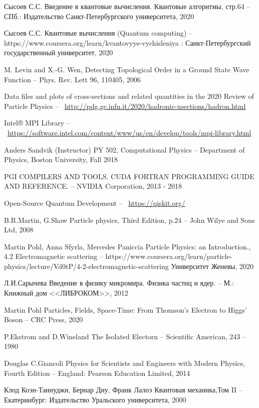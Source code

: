 \documentclass[11pt]{article}
\begin{document}
\begin{thebibliography}{3}
Сысоев С.С. Введение в квантовые вычисления. Квантовые алгоритмы, стр.64 -- СПб.: Издательство Санкт-Петербургского университета, 2020

Сысоев С.С. Квантовые вычисления (Quantum computing) -- https://www.coursera.org/learn/kvantovyye-vychisleniya : Санкт-Петербургский государственный университет, 2020

M. Levin and X.-G. Wen, Detecting Topological Order in a Ground State Wave Function -- Phys. Rev. Lett 96, 110405, 2006

Data files and plots of cross-sections and related quantities
in the 2020 Review of Particle Physics -- ~\url{http://pdg.ge.infn.it/2020/hadronic-xsections/hadron.html}

Intel® MPI Library -- ~\url{https://software.intel.com/content/www/us/en/develop/tools/mpi-library.html}

Anders Sandvik (Instructor) PY 502, Computational Physics -- Department of Physics, Boston University, Fall 2018

PGI COMPILERS AND TOOLS. CUDA FORTRAN PROGRAMMING GUIDE AND REFERENCE. -- NVIDIA Corporation, 2013 - 2018

Open-Source Quantum Development -- ~\url{https://qiskit.org/}

B.R.Martin, G.Shaw Particle physics, Third Edition, p.24 -- John Wilye and Sons Ltd, 2008

Martin Pohl, Anna Sfyrla, Mercedes Paniccia Particle Physics: an Introduction., 4.2 Electromagnetic scattering -- https://www.coursera.org/learn/particle-physics/lecture/Vd0tP/4-2-electromagnetic-scattering Университет Женевы, 2020

Л.И.Сарычева Введение в физику микромира. Физика частиц и ядер. -- М.: Книжный дом <<ЛИБРОКОМ>>, 2012 

Martin Pohl Particles, Fields, Space-Time: From Thomson's Electron to Higgs' Boson -- CRC Press, 2020

P.Ekstrom and D.Wineland The Isolated Electorn -- Scientific American, 243 -- 1980

Douglas C.Giancoli Physics for Scientists and Engineers with Modern Physics, Fourth Edition -- England: Pearson Education Limited, 2014 

Клод Коэн-Таннуджи, Бернар Диу, Франк Лалоэ Квантовая механика,Том II -- Екатеринбург: Издательство Уральского университета, 2000 


\end{thebibliography}
\end{document}
